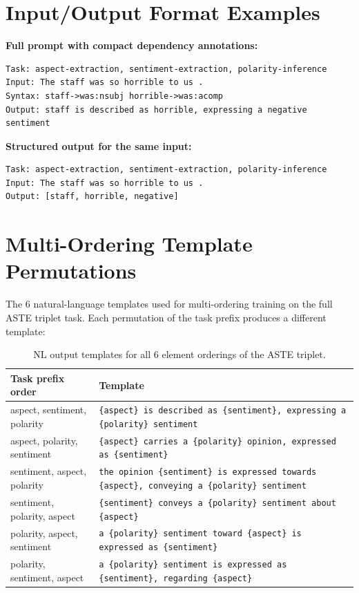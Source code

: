 \documentclass[12pt,a4paper]{report}
\begin{document}
\section{Input/Output Format Examples}

\textbf{Full prompt with compact dependency annotations:}
\begin{lstlisting}
Task: aspect-extraction, sentiment-extraction, polarity-inference
Input: The staff was so horrible to us .
Syntax: staff->was:nsubj horrible->was:acomp
Output: staff is described as horrible, expressing a negative sentiment
\end{lstlisting}

\textbf{Structured output for the same input:}
\begin{lstlisting}
Task: aspect-extraction, sentiment-extraction, polarity-inference
Input: The staff was so horrible to us .
Output: [staff, horrible, negative]
\end{lstlisting}


\section{Multi-Ordering Template Permutations}\label{sec:annex-templates}

The 6 natural-language templates used for multi-ordering training on the full ASTE triplet task. Each permutation of the task prefix produces a different template:

\begin{table}[H]
\centering
\caption{NL output templates for all 6 element orderings of the ASTE triplet.}
\small
\begin{tabular}{@{}lp{10.5cm}@{}}
\toprule
\textbf{Task prefix order} & \textbf{Template} \\
\midrule
aspect, sentiment, polarity & \texttt{\{aspect\} is described as \{sentiment\}, expressing a \{polarity\} sentiment} \\
aspect, polarity, sentiment & \texttt{\{aspect\} carries a \{polarity\} opinion, expressed as \{sentiment\}} \\
sentiment, aspect, polarity & \texttt{the opinion \{sentiment\} is expressed towards \{aspect\}, conveying a \{polarity\} sentiment} \\
sentiment, polarity, aspect & \texttt{\{sentiment\} conveys a \{polarity\} sentiment about \{aspect\}} \\
polarity, aspect, sentiment & \texttt{a \{polarity\} sentiment toward \{aspect\} is expressed as \{sentiment\}} \\
polarity, sentiment, aspect & \texttt{a \{polarity\} sentiment is expressed as \{sentiment\}, regarding \{aspect\}} \\
\bottomrule
\end{tabular}
\end{table}
\end{document}
